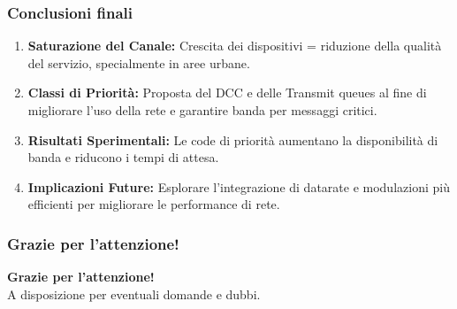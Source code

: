 \documentclass{beamer}
\begin{document}
\begin{frame}
    \frametitle{Conclusioni finali}

    \begin{enumerate}
        \vspace{5pt}
        \item \textbf{Saturazione del Canale:} Crescita dei dispositivi = riduzione della qualità del servizio, specialmente in aree urbane.
        \vspace{5pt}
        \item \textbf{Classi di Priorità:} Proposta del DCC e delle Transmit queues al fine di migliorare l'uso della rete e garantire banda per messaggi critici.
        \vspace{5pt}
        \item \textbf{Risultati Sperimentali:} Le code di priorità aumentano la disponibilità di banda e riducono i tempi di attesa.
        \vspace{5pt}
        \item \textbf{Implicazioni Future:} Esplorare l'integrazione di datarate e modulazioni più efficienti per migliorare le performance di rete.
        \vspace{5pt}
    \end{enumerate}

\end{frame}

\begin{frame}
    \frametitle{Grazie per l'attenzione!}

    \begin{center}
        \textbf{Grazie per l'attenzione!} \\[1em]
        A disposizione per eventuali domande e dubbi.
    \end{center}

\end{frame}
\end{document}
